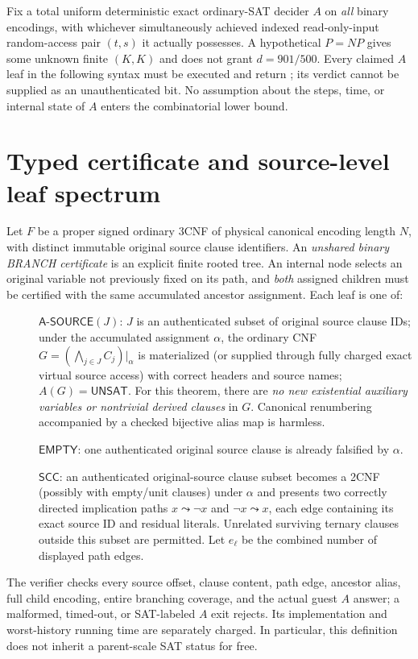 \documentclass[11pt]{article}
\newcommand{\UNSAT}{\mathsf{UNSAT}}
\begin{document}
Fix a total uniform deterministic exact ordinary-SAT decider $A$ on \emph{all} binary encodings, with whichever simultaneously achieved indexed read-only-input random-access pair $(t,s)$ it actually possesses. A hypothetical $P=NP$ gives some unknown finite $(K,K)$ and does not grant $d=901/500$. Every claimed $A$ leaf in the following syntax must be executed and return \UNSAT; its verdict cannot be supplied as an unauthenticated bit. No assumption about the steps, time, or internal state of $A$ enters the combinatorial lower bound.

\section{Typed certificate and source-level leaf spectrum}
Let $F$ be a proper signed ordinary $3$CNF of physical canonical encoding length $N$, with distinct immutable original source clause identifiers. An \emph{unshared binary BRANCH certificate} is an explicit finite rooted tree. An internal node selects an original variable not previously fixed on its path, and \emph{both} assigned children must be certified with the same accumulated ancestor assignment. Each leaf is one of:
\begin{description}
\item[] $\mathsf{A\mbox{-}SOURCE}(J)$: $J$ is an authenticated subset of original source clause IDs; under the accumulated assignment $\alpha$, the ordinary CNF $G=(\bigwedge_{j\in J} C_j)|_\alpha$ is materialized (or supplied through fully charged exact virtual source access) with correct headers and source names; $A(G)=\UNSAT$. For this theorem, there are \emph{no new existential auxiliary variables or nontrivial derived clauses} in $G$. Canonical renumbering accompanied by a checked bijective alias map is harmless.
\item[] $\mathsf{EMPTY}$: one authenticated original source clause is already falsified by $\alpha$.
\item[] $\mathsf{SCC}$: an authenticated original-source clause subset becomes a 2CNF (possibly with empty/unit clauses) under $\alpha$ and presents two correctly directed implication paths $x\leadsto\neg x$ and $\neg x\leadsto x$, each edge containing its exact source ID and residual literals. Unrelated surviving ternary clauses outside this subset are permitted. Let $e_\ell$ be the combined number of displayed path edges.
\end{description}
The verifier checks every source offset, clause content, path edge, ancestor alias, full child encoding, entire branching coverage, and the actual guest $A$ answer; a malformed, timed-out, or SAT-labeled $A$ exit rejects. Its implementation and worst-history running time are separately charged. In particular, this definition does not inherit a parent-scale SAT status for free.
\end{document}
